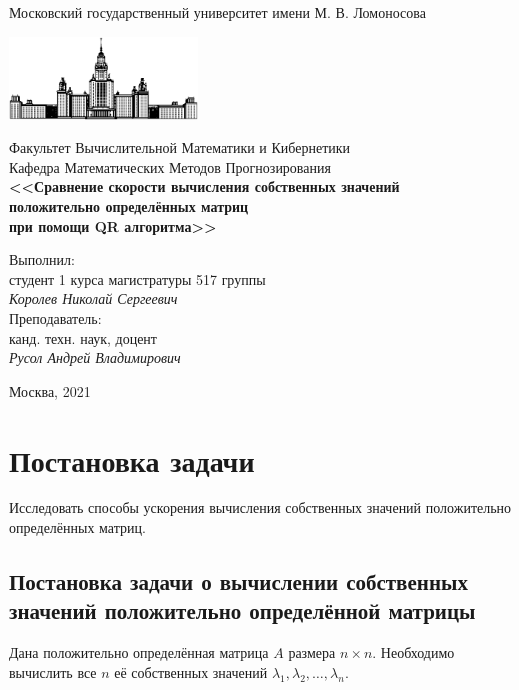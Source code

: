 \documentclass[12pt, fleqn]{article}
\begin{document}
\begin{titlepage}
\begin{center}
    Московский государственный университет имени М. В. Ломоносова

    \bigskip
    \includegraphics[width=50mm]{msu.eps}

    \bigskip
    Факультет Вычислительной Математики и Кибернетики\\
    Кафедра Математических Методов Прогнозирования\\[10mm]

    \textsf{\large\bfseries
        <<Сравнение скорости вычисления собственных значений\\ положительно определённых матриц\\ при помощи QR алгоритма>>
    }\\[20mm]

    \begin{flushright}
        \parbox{0.5\textwidth}{
            Выполнил:\\
            студент 1 курса магистратуры 517 группы\\
            \emph{Королев Николай Сергеевич}\\[5mm]
            Преподаватель:\\
            канд. техн. наук, доцент\\
            \emph{Русол Андрей Владимирович}
        }
    \end{flushright}

    \vspace{\fill}
    Москва, 2021
\end{center}
\end{titlepage}

\newpage
\section{Постановка задачи}

Исследовать способы ускорения вычисления собственных значений положительно определённых матриц.

\subsection{Постановка задачи о вычислении собственных значений положительно определённой матрицы}
Дана положительно определённая матрица $A$ размера $n \times n$. Необходимо вычислить все $n$ её собственных значений $\lambda_1, \lambda_2, \dots, \lambda_n$.
\end{document}
